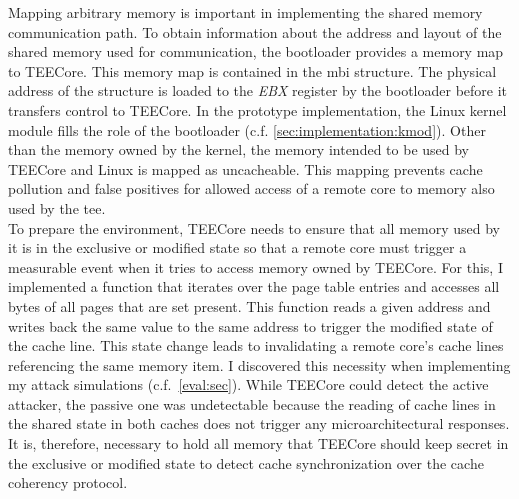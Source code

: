 Mapping arbitrary memory is important in implementing the shared memory
communication path. To obtain information about the address and layout of the
shared memory used for communication, the bootloader provides a memory map to
TEECore. This memory map is contained in the \gls{mbi} structure. The physical
address of the structure is loaded to the \textit{EBX} register by the
bootloader before it transfers control to TEECore. In the prototype
implementation, the Linux kernel module fills the role of the bootloader (c.f.
\ref{sec:implementation:kmod}). Other than the memory owned by the kernel, the
memory intended to be used by TEECore and Linux is mapped as uncacheable. This
mapping prevents cache pollution and false positives for allowed access of a
remote core to memory also used by the \gls{tee}.\\

To prepare the environment, TEECore needs to ensure that all memory used by it
is in the exclusive or modified state so that a remote core must trigger a
measurable event when it tries to access memory owned by TEECore. For this, I
implemented a function that iterates over the page table entries and accesses
all bytes of all pages that are set present. This function reads a given address
and writes back the same value to the same address to trigger the modified state
of the cache line. This state change leads to invalidating a remote core's cache
lines referencing the same memory item. I discovered this necessity when
implementing my attack simulations (c.f.~\ref{eval:sec}). While TEECore could
detect the active attacker, the passive one was undetectable because the reading
of cache lines in the shared state in both caches does not trigger any
microarchitectural responses. It is, therefore, necessary to hold all memory
that TEECore should keep secret in the exclusive or modified state to detect
cache synchronization over the cache coherency protocol.\\


